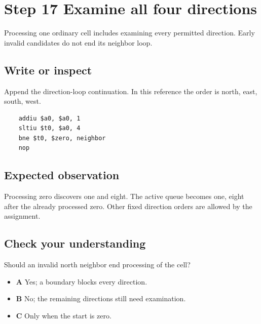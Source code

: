 \section{Step 17 Examine all four directions}\label{maze-s17}

Processing one ordinary cell includes examining every permitted direction. Early invalid candidates do not end its neighbor loop.

\subsection{Write or inspect}

Append the direction-loop continuation. In this reference the order is north, east, south, west.

\begin{verbatim}
    addiu $a0, $a0, 1
    sltiu $t0, $a0, 4
    bne $t0, $zero, neighbor
    nop
\end{verbatim}

\subsection{Expected observation}

Processing zero discovers one and eight. The active queue becomes one, eight after the already processed zero. Other fixed direction orders are allowed by the assignment.

\subsection{Check your understanding}

Should an invalid north neighbor end processing of the cell?

\begin{itemize}
  \item \textbf{A} Yes; a boundary blocks every direction.
  \item \textbf{B} No; the remaining directions still need examination.
  \item \textbf{C} Only when the start is zero.
\end{itemize}
